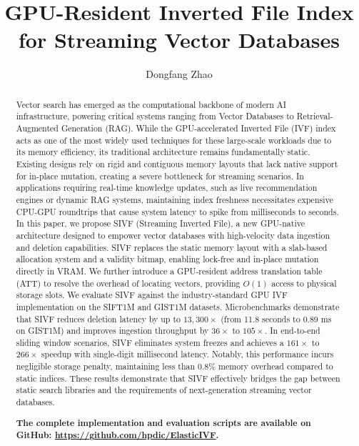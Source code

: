 \documentclass[sigconf,nonacm]{acmart}
\theoremstyle{plain}
\theoremstyle{definition}
\theoremstyle{remark}
\begin{document}
\title{GPU-Resident Inverted File Index for Streaming Vector Databases}

\author{Dongfang Zhao}

\begin{abstract}
Vector search has emerged as the computational backbone of modern AI infrastructure, powering critical systems ranging from Vector Databases to Retrieval-Augmented Generation (RAG). While the GPU-accelerated Inverted File (IVF) index acts as one of the most widely used techniques for these large-scale workloads due to its memory efficiency, its traditional architecture remains fundamentally static. Existing designs rely on rigid and contiguous memory layouts that lack native support for in-place mutation, creating a severe bottleneck for streaming scenarios. In applications requiring real-time knowledge updates, such as live recommendation engines or dynamic RAG systems, maintaining index freshness necessitates expensive CPU-GPU roundtrips that cause system latency to spike from milliseconds to seconds.
In this paper, we propose SIVF (Streaming Inverted File), a new GPU-native architecture designed to empower vector databases with high-velocity data ingestion and deletion capabilities. SIVF replaces the static memory layout with a slab-based allocation system and a validity bitmap, enabling lock-free and in-place mutation directly in VRAM. We further introduce a GPU-resident address translation table (ATT) to resolve the overhead of locating vectors, providing $O(1)$ access to physical storage slots.
We evaluate SIVF against the industry-standard GPU IVF implementation on the SIFT1M and GIST1M datasets. Microbenchmarks demonstrate that SIVF reduces deletion latency by up to $13,300\times$ (from 11.8 seconds to 0.89 ms on GIST1M) and improves ingestion throughput by $36\times$ to $105\times$. In end-to-end sliding window scenarios, SIVF eliminates system freezes and achieves a $161\times$ to $266\times$ speedup with single-digit millisecond latency. Notably, this performance incurs negligible storage penalty, maintaining less than 0.8\% memory overhead compared to static indices. These results demonstrate that SIVF effectively bridges the gap between static search libraries and the requirements of next-generation streaming vector databases.

\noindent
\textbf{The complete implementation and evaluation scripts are available on GitHub: \url{https://github.com/hpdic/ElasticIVF}.}
\end{abstract}
\end{document}
